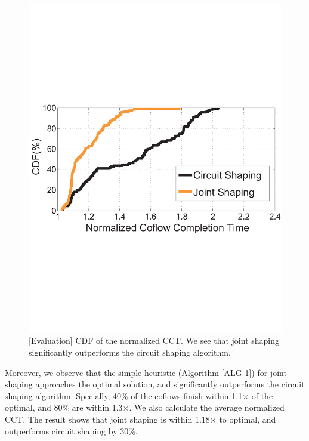 \begin{figure}[t]
  \centering
  \includegraphics[scale=0.32]{figures/initial1}%
  \caption{[Evaluation] CDF of the normalized CCT. We see that joint shaping significantly outperforms the circuit shaping algorithm.}
  \label{fig:result}
\end{figure}

Moreover, we observe that the simple heuristic (Algorithm \ref{ALG-1}) for joint shaping approaches the optimal solution, and significantly outperforms the circuit shaping algorithm. Specially, 40\% of the coflows finish within 1.1$\times$ of the optimal, and 80\% are within 1.3$\times$.
We also calculate the average normalized CCT. The result shows that joint shaping is within 1.18$\times$ to optimal, and outperforms circuit shaping by 30\%.




